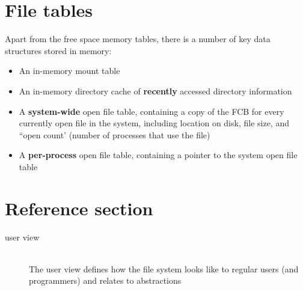 \documentclass{article}
\begin{document}
\section{File tables}
\begin{flushleft}
Apart from the free space memory tables, there is a number of key data structures stored in memory: 
\begin{itemize}
	\item An in-memory mount table
	\item An in-memory directory cache of \textbf{recently} accessed directory information
	\item A \textbf{system-wide} open file table, containing a copy of the FCB for every currently open file in the system, including location on disk, file size, and “open count’ (number of processes that use the file)
	\item A \textbf{per-process} open file table, containing a pointer to the system open file table
\end{itemize}
\end{flushleft}

\pagebreak
\section*{Reference section} \label{sec:reference}
\begin{description}
	\item[user view] \hfill \\ The user view defines how the file system looks like to regular users
(and programmers) and relates to abstractions
\end{description}
\end{document}
